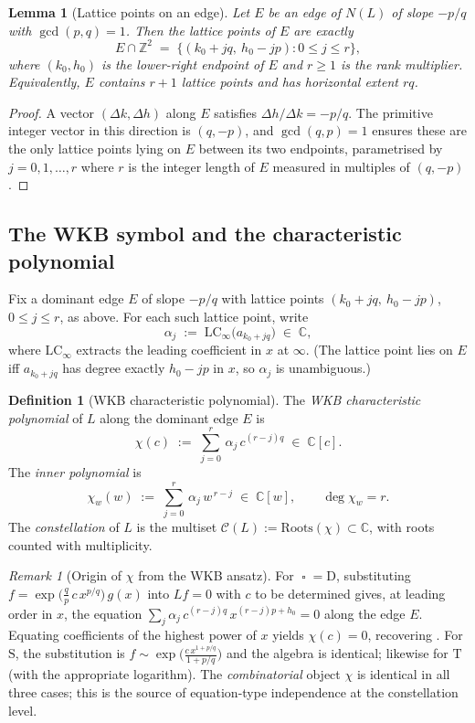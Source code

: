 \documentclass[11pt,a4paper]{article}
\theoremstyle{plain}
\newtheorem{lemma}[theorem]{Lemma}
\theoremstyle{definition}
\newtheorem{definition}[theorem]{Definition}
\theoremstyle{remark}
\newtheorem{remark}[theorem]{Remark}
\newcommand{\op}{\mathop{\square}}                %
\newcommand{\opD}{\mathrm{D}}                     %
\newcommand{\opS}{\mathrm{S}}                     %
\newcommand{\opT}{\mathrm{T}}                     %
\newcommand{\LCinf}{\mathrm{LC}_\infty}
\newcommand{\Roots}{\mathrm{Roots}}
\newcommand{\NL}{N(L)}
\newcommand{\Cl}{\mathcal{C}}
\begin{document}
\begin{lemma}[Lattice points on an edge]\label{lem:lattice-on-edge}
Let $E$ be an edge of $\NL$ of slope $-p/q$ with $\gcd(p, q) = 1$. Then
the lattice points of $E$ are exactly
\[
   E \cap \mathbb{Z}^2
   \;=\;
   \big\{(k_0 + jq,\ h_0 - jp) : 0 \le j \le r\big\},
\]
where $(k_0, h_0)$ is the lower-right endpoint of $E$ and $r \ge 1$ is the
\emph{rank multiplier}. Equivalently, $E$ contains $r + 1$ lattice points
and has horizontal extent $rq$.
\end{lemma}

\begin{proof}
A vector $(\Delta k, \Delta h)$ along $E$ satisfies
$\Delta h / \Delta k = -p/q$. The primitive integer vector in this
direction is $(q, -p)$, and $\gcd(q, p) = 1$ ensures these are the only
lattice points lying on $E$ between its two endpoints, parametrised by
$j = 0, 1, \dots, r$ where $r$ is the integer length of $E$ measured in
multiples of $(q, -p)$.
\end{proof}

\subsection{The WKB symbol and the characteristic polynomial}\label{ssec:prelim-WKB}

Fix a dominant edge $E$ of slope $-p/q$ with lattice points
$(k_0 + jq,\ h_0 - jp)$, $0 \le j \le r$, as above. For each such lattice
point, write
\[
   \alpha_j
   \;:=\;
   \LCinf\big(a_{k_0 + jq}\big)
   \;\in\; \mathbb{C},
\]
where $\LCinf$ extracts the leading coefficient in $x$ at $\infty$.
(The lattice point lies on $E$ iff $a_{k_0 + jq}$ has degree exactly
$h_0 - jp$ in $x$, so $\alpha_j$ is unambiguous.)

\begin{definition}[WKB characteristic polynomial]\label{def:chi}
The \emph{WKB characteristic polynomial} of $L$ along the dominant edge $E$
is
\[
   \chi(c)
   \;:=\;
   \sum_{j=0}^{r}\, \alpha_j\, c^{(r-j)q}
   \;\in\; \mathbb{C}[c].
\]
The \emph{inner polynomial} is
\[
   \chi_w(w)
   \;:=\;
   \sum_{j=0}^{r}\, \alpha_j\, w^{\,r-j}
   \;\in\; \mathbb{C}[w],
   \qquad \deg \chi_w = r.
\]
The \emph{constellation} of $L$ is the multiset
$\Cl(L) := \Roots(\chi) \subset \mathbb{C}$, with roots counted with
multiplicity.
\end{definition}

\begin{remark}[Origin of $\chi$ from the WKB ansatz]\label{rem:chi-from-ansatz}
For $\op = \opD$, substituting $f = \exp\!\big(\frac{q}{p}\, c\, x^{p/q}\big)\,
g(x)$ into $L f = 0$ with $c$ to be determined gives, at leading order in
$x$, the equation $\sum_j \alpha_j\, c^{(r-j)q}\, x^{(r-j)p + h_0} = 0$ along
the edge $E$. Equating coefficients of the highest power of $x$ yields
$\chi(c) = 0$, recovering . For $\opS$, the substitution is
$f \sim \exp\!\big(\frac{c\, x^{1 + p/q}}{1 + p/q}\big)$ and the algebra is
identical; likewise for $\opT$ (with the appropriate logarithm). The
\emph{combinatorial} object $\chi$ is identical in all three cases; this
is the source of equation-type independence at the constellation level.
\end{remark}
\end{document}

